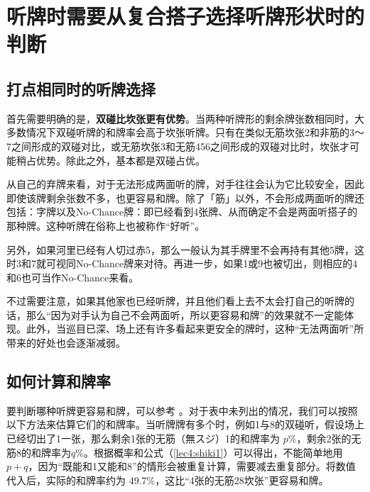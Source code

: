 \chapter[听牌的选择]{听牌时需要从复合搭子选择听牌形状时的判断}

\section{打点相同时的听牌选择}

首先需要明确的是，\textbf{双碰比坎张更有优势}。当两种听牌形的剩余牌张数相同时，大多数情况下双碰听牌的和牌率会高于坎张听牌。只有在类似无筋坎张2和非筋的3～7之间形成的双碰对比，或无筋坎张3和无筋456之间形成的双碰对比时，坎张才可能稍占优势。除此之外，基本都是双碰占优。

从自己的弃牌来看，对于无法形成两面听的牌，对手往往会认为它比较安全，因此即使该牌剩余张数不多，也更容易和牌。除了「筋」以外，不会形成两面听的牌还包括：字牌以及No-Chance牌：即已经看到4张牌、从而确定不会是两面听搭子的那种牌。这种听牌在俗称上也被称作“好听”。

另外，如果河里已经有人切过赤5，那么一般认为其手牌里不会再持有其他5牌，这时3和7就可视同No-Chance牌来对待。再进一步，如果1或9也被切出，则相应的4和6也可当作No-Chance来看。

不过需要注意，如果其他家也已经听牌，并且他们看上去不太会打自己的听牌的话，那么“因为对手认为自己不会两面听，所以更容易和牌”的效果就不一定能体现。此外，当巡目已深、场上还有许多看起来更安全的牌时，这种“无法两面听”所带来的好处也会逐渐减弱。

\section{如何计算和牌率}
要判断哪种听牌更容易和牌，可以参考
。对于表中未列出的情况，我们可以按照以下方法来估算它们的和牌率。当听牌牌有多个时，例如1与8的双碰听，假设场上已经切出了1一张，那么剩余1张的无筋（無スジ）1的和牌率为 $p$\%，剩余2张的无筋8的和牌率为$q$\%。根据概率和公式（\ref{lec4:shiki1}）可以得出，不能简单地用 $p + q$，因为“既能和1又能和8”的情形会被重复计算，需要减去重复部分。将数值代入后，实际的和牌率约为 49.7\%，这比“4张的无筋28坎张”更容易和牌。

